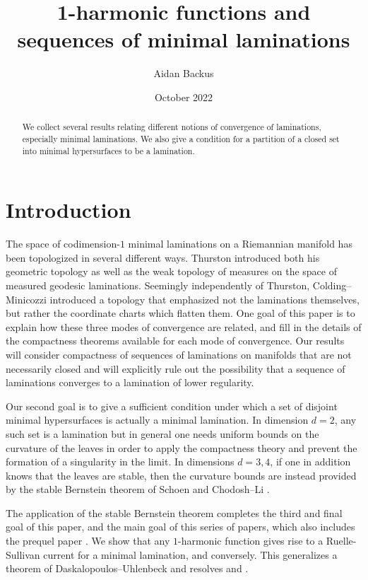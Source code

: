 \documentclass[reqno,11pt]{amsart}
\title{1-harmonic functions and sequences of minimal laminations}
\author{Aidan Backus}
\date{October 2022}
\theoremstyle{definition}
\numberwithin{equation}{section}
\begin{document}
\begin{abstract}
We collect several results relating different notions of convergence of laminations, especially minimal laminations.
We also give a condition for a partition of a closed set into minimal hypersurfaces to be a lamination.
\end{abstract}

\maketitle



\section{Introduction}
The space of codimension-$1$ minimal laminations on a Riemannian manifold has been topologized in several different ways.
Thurston \cite[Chapter 8]{thurston1979geometry} introduced both his geometric topology as well as the weak topology of measures on the space of measured geodesic laminations.
Seemingly independently of Thurston, Colding--Minicozzi \cite[Appendix B]{ColdingMinicozziIV} introduced a topology that emphasized not the laminations themselves, but rather the coordinate charts which flatten them.
One goal of this paper is to explain how these three modes of convergence are related, and fill in the details of the compactness theorems available for each mode of convergence.
Our results will consider compactness of sequences of laminations on manifolds that are not necessarily closed and will explicitly rule out the possibility that a sequence of laminations converges to a lamination of lower regularity.

Our second goal is to give a sufficient condition under which a set of disjoint minimal hypersurfaces is actually a minimal lamination.
In dimension $d = 2$, any such set is a lamination \cite[Proposition 7.3]{daskalopoulos2020transverse} but in general one needs uniform bounds on the curvature of the leaves in order to apply the compactness theory and prevent the formation of a singularity in the limit.
In dimensions $d = 3, 4$, if one in addition knows that the leaves are stable, then the curvature bounds are instead provided by the stable Bernstein theorem of Schoen \cite{Schoen2016} and Chodosh--Li \cite{Chodosh2021}.

The application of the stable Bernstein theorem completes the third and final goal of this paper, and the main goal of this series of papers, which also includes the prequel paper \cite{BackusFLG}.
We show that any $1$-harmonic function gives rise to a Ruelle-Sullivan current for a minimal lamination, and conversely.
This generalizes a theorem of Daskalopoulos--Uhlenbeck \cite[Theorem 6.1]{daskalopoulos2020transverse} and resolves \cite[Problem 9.4]{daskalopoulos2020transverse} and \cite[Conjecture 9.5]{daskalopoulos2020transverse}.
\end{document}
